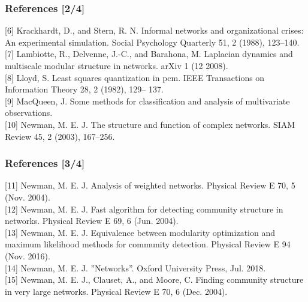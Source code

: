 \documentclass{beamer}
\begin{document}
\begin{frame}
    \frametitle{References [2/4]}

    [6] Krackhardt, D., and Stern, R. N. Informal
    networks and organizational crises: An experimental
    simulation. Social Psychology Quarterly 51, 2 (1988),
    123–140. \\

    [7] Lambiotte, R., Delvenne, J.-C., and Barahona,
    M. Laplacian dynamics and multiscale modular
    structure in networks. arXiv 1 (12 2008). \\

    [8] Lloyd, S. Least squares quantization in pcm. IEEE
    Transactions on Information Theory 28, 2 (1982), 129–
    137. \\

    [9] MacQueen, J. Some methods for classification and
    analysis of multivariate observations. \\

    [10] Newman, M. E. J. The structure and function of
    complex networks. SIAM Review 45, 2 (2003), 167–256.

\end{frame}

\begin{frame}
    \frametitle{References [3/4]}

    [11] Newman, M. E. J. Analysis of weighted networks.
    Physical Review E 70, 5 (Nov. 2004). \\

    [12] Newman, M. E. J. Fast algorithm for detecting
    community structure in networks. Physical Review E
    69, 6 (Jun. 2004). \\

    [13] Newman, M. E. J. Equivalence between modularity
    optimization and maximum likelihood methods for
    community detection. Physical Review E 94 (Nov.
    2016). \\

    [14] Newman, M. E. J. ”Networks”. Oxford University
    Press, Jul. 2018. \\

    [15] Newman, M. E. J., Clauset, A., and Moore, C.
    Finding community structure in very large networks.
    Physical Review E 70, 6 (Dec. 2004).

\end{frame}
\end{document}
